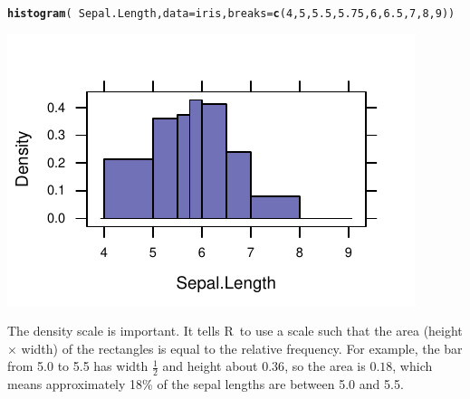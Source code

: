 \documentclass[twoside]{book}\usepackage[]{graphicx}\usepackage[]{xcolor}
\makeatletter
\def\maxwidth{ %
  \ifdim\Gin@nat@width>\linewidth
    \linewidth
  \else
    \Gin@nat@width
  \fi
}
\newcommand{\hlnum}[1]{\textcolor[rgb]{0.686,0.059,0.569}{#1}}%
\newcommand{\hlopt}[1]{\textcolor[rgb]{0,0,0}{#1}}%
\newcommand{\hlstd}[1]{\textcolor[rgb]{0.345,0.345,0.345}{#1}}%
\newcommand{\hlkwc}[1]{\textcolor[rgb]{0.333,0.667,0.333}{#1}}%
\newcommand{\hlkwd}[1]{\textcolor[rgb]{0.737,0.353,0.396}{\textbf{#1}}}%
\newenvironment{kframe}{%
 \def\at@end@of@kframe{}%
 \ifinner\ifhmode%
  \def\at@end@of@kframe{\end{minipage}}%
  \begin{minipage}{\columnwidth}%
 \fi\fi%
 \def\FrameCommand##1{\hskip\@totalleftmargin \hskip-\fboxsep
 \colorbox{shadecolor}{##1}\hskip-\fboxsep
     \hskip-\linewidth \hskip-\@totalleftmargin \hskip\columnwidth}%
 \MakeFramed {\advance\hsize-\width
   \@totalleftmargin\z@ \linewidth\hsize
   \@setminipage}}%
 {\par\unskip\endMakeFramed%
 \at@end@of@kframe}
\newenvironment{knitrout}{}{} %
\def\R{{\sf R}}
\newcounter{example}[section]
\makeatother
\begin{document}
\begin{knitrout}
\color{fgcolor}\begin{kframe}
\begin{alltt}
\hlkwd{histogram}\hlstd{(} \hlopt{~} \hlstd{Sepal.Length,} \hlkwc{data}\hlstd{=iris,} \hlkwc{breaks}\hlstd{=}\hlkwd{c}\hlstd{(}\hlnum{4}\hlstd{,}\hlnum{5}\hlstd{,}\hlnum{5.5}\hlstd{,}\hlnum{5.75}\hlstd{,}\hlnum{6}\hlstd{,}\hlnum{6.5}\hlstd{,}\hlnum{7}\hlstd{,}\hlnum{8}\hlstd{,}\hlnum{9}\hlstd{))}
\end{alltt}
\end{kframe}

{\centering \includegraphics[width=\maxwidth]{figures/fig-hist-unequal-bins-1} 

}



\end{knitrout}
The density scale is important.
It tells \R\ to use a scale such that 
the area (height $\times$ width) of the rectangles is equal to the relative frequency.
For example, the bar from 5.0 to 5.5 has width $\frac12$ and height about $0.36$, so 
the area is $0.18$, which means approximately 18\% of the sepal lengths are 
between 5.0 and 5.5.
\end{document}
